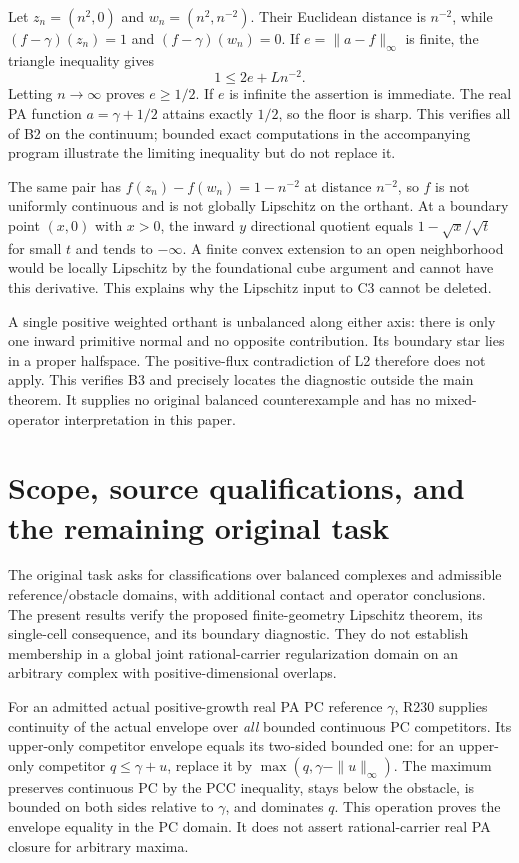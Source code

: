 \documentclass[
  11pt,
]{article}
\begin{document}
Let \(z_n=(n^2,0)\) and \(w_n=(n^2,n^{-2})\). Their Euclidean distance
is \(n^{-2}\), while \((f-\gamma)(z_n)=1\) and \((f-\gamma)(w_n)=0\). If
\(e=\|a-f\|_\infty\) is finite, the triangle inequality gives
\[ 1\leq2e+L n^{-2}. \] Letting \(n\to\infty\) proves \(e\geq1/2\). If
\(e\) is infinite the assertion is immediate. The real PA function
\(a=\gamma+1/2\) attains exactly \(1/2\), so the floor is sharp. This
verifies all of B2 on the continuum; bounded exact computations in the
accompanying program illustrate the limiting inequality but do not
replace it.

The same pair has \(f(z_n)-f(w_n)=1-n^{-2}\) at distance \(n^{-2}\), so
\(f\) is not uniformly continuous and is not globally Lipschitz on the
orthant. At a boundary point \((x,0)\) with \(x>0\), the inward \(y\)
directional quotient equals \(1-\sqrt{x}/\sqrt t\) for small \(t\) and
tends to \(-\infty\). A finite convex extension to an open neighborhood
would be locally Lipschitz by the foundational cube argument and cannot
have this derivative. This explains why the Lipschitz input to C3 cannot
be deleted.

A single positive weighted orthant is unbalanced along either axis:
there is only one inward primitive normal and no opposite contribution.
Its boundary star lies in a proper halfspace. The positive-flux
contradiction of L2 therefore does not apply. This verifies B3 and
precisely locates the diagnostic outside the main theorem. It supplies
no original balanced counterexample and has no mixed-operator
interpretation in this paper.

\section{Scope, source qualifications, and the remaining original
task}\label{scope-source-qualifications-and-the-remaining-original-task}

The original task asks for classifications over balanced complexes and
admissible reference/obstacle domains, with additional contact and
operator conclusions. The present results verify the proposed
finite-geometry Lipschitz theorem, its single-cell consequence, and its
boundary diagnostic. They do not establish membership in a global joint
rational-carrier regularization domain on an arbitrary complex with
positive-dimensional overlaps.

For an admitted actual positive-growth real PA PC reference \(\gamma\),
R230 supplies continuity of the actual envelope over \emph{all} bounded
continuous PC competitors. Its upper-only competitor envelope equals its
two-sided bounded one: for an upper-only competitor \(q\leq\gamma+u\),
replace it by \(\max(q,\gamma-\|u\|_\infty)\). The maximum preserves
continuous PC by the PCC inequality, stays below the obstacle, is
bounded on both sides relative to \(\gamma\), and dominates \(q\). This
operation proves the envelope equality in the PC domain. It does not
assert rational-carrier real PA closure for arbitrary maxima.
\end{document}
